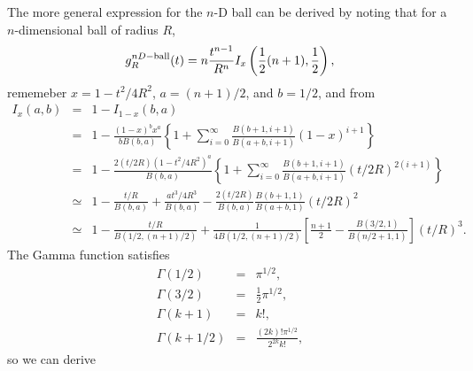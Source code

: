 

The more general expression for the $n$-D ball can be derived by
noting that for a $n$-dimensional ball of radius $R$,
\begin{equation}
 g^{nD-{\rm ball}}_R(t) = n \frac{t^{n-1}}{R^n} I_x\left( 
  \frac{1}{2} (n+1), \frac{1}{2}
                      \right),
\end{equation}
rememeber $x = 1 - t^2/4R^2$, $a=(n+1)/2$, and $b=1/2$, and from
\cite[26.5.4]{Abramowitz_and_Stegun}
\begin{eqnarray}
  \label{eq:Ix}
  I_x(a,b) 
 & = & 1 - I_{1-x}(b,a)
                    \nonumber \\
 & = & 1 - \frac{(1-x)^b x^a}{b B(b,a)}  \left\{ 
               1 +
               \sum_{i=0}^{\infty} \frac{B(b+1,i+1)}{B(a+b,i+1)} (1-x)^{i+1}
           \right\} 
               \nonumber \\
 & = & 1 - \frac{2 (t/2R) (1 - t^2/4R^2)^a}{B(b,a)}  \left\{ 
               1 +
               \sum_{i=0}^{\infty} \frac{B(b+1,i+1)}{B(a+b,i+1)} (t/2R)^{2(i+1)}
           \right\} 
               \nonumber \\
 & \simeq & 1 - \frac{t/R}{B(b,a)} 
               + \frac{a t^3/4R^3 }{B(b,a)} 
               - \frac{2 (t/2R)}{B(b,a)} \frac{B(b+1,1)}{B(a+b,1)} (t/2R)^{2}
               \nonumber \\
 & \simeq & 1 - \frac{t/R}{B(1/2,(n+1)/2)} 
               + \frac{1}{4 B(1/2,(n+1)/2)} 
                   \left[ \frac{n+1}{2}
                          -\frac{B(3/2,1)}{B(n/2+1,1)} \right] (t/R)^{3}.
\end{eqnarray}
The Gamma function satisfies\cite[6.1.12]{Abramowitz_and_Stegun}
\begin{eqnarray}
  \label{eq:gamma}
  \Gamma(1/2) & = & \pi^{1/2}, \\
  \Gamma(3/2) & = & \frac{1}{2} \pi^{1/2}, \\
  \Gamma(k+1) & = & k!, \\
  \Gamma(k+1/2) & = & \frac{(2k)! \pi^{1/2}}{2^{2k} k!},
\end{eqnarray}
so we can derive
